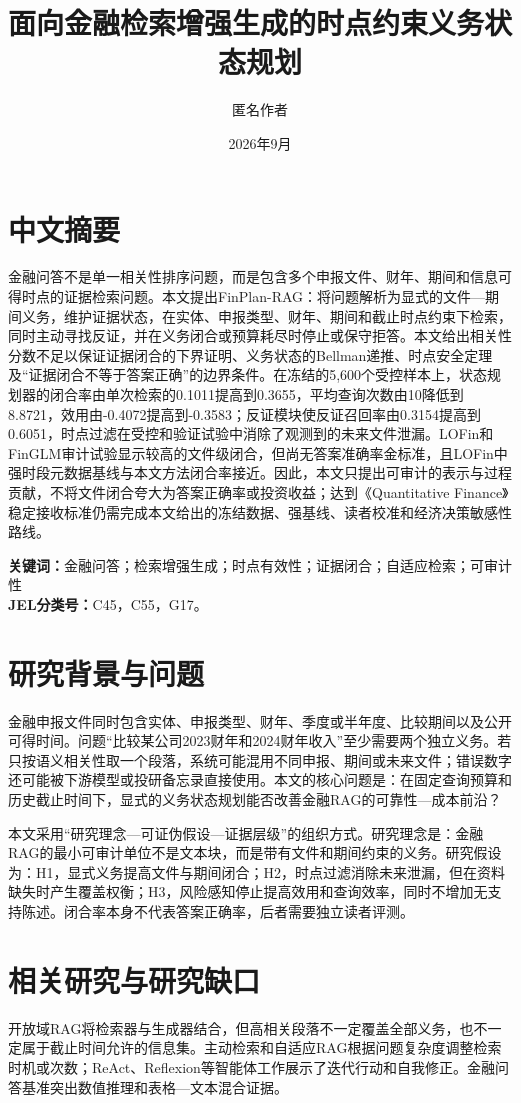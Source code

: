 \documentclass[12pt,openright]{ctexbook}
\title{面向金融检索增强生成的\mbox{时点约束义务状态规划}}
\author{匿名作者}
\date{2026年9月}
\newcommand{\finplan}{FinPlan\mbox{-}RAG}
\begin{document}
\frontmatter
\maketitle
\chapter*{中文摘要}
金融问答不是单一相关性排序问题，而是包含多个申报文件、财年、期间和信息可得时点的证据检索问题。本文提出\finplan：将问题解析为显式的文件—期间义务，维护证据状态，在实体、申报类型、财年、期间和截止时点约束下检索，同时主动寻找反证，并在义务闭合或预算耗尽时停止或保守拒答。本文给出相关性分数不足以保证证据闭合的下界证明、义务状态的Bellman递推、时点安全定理及“证据闭合不等于答案正确”的边界条件。在冻结的5,600个受控样本上，状态规划器的闭合率由单次检索的0.1011提高到0.3655，平均查询次数由10降低到8.8721，效用由-0.4072提高到-0.3583；反证模块使反证召回率由0.3154提高到0.6051，时点过滤在受控和验证试验中消除了观测到的未来文件泄漏。LOFin和FinGLM审计试验显示较高的文件级闭合，但尚无答案准确率金标准，且LOFin中强时段元数据基线与本文方法闭合率接近。因此，本文只提出可审计的表示与过程贡献，不将文件闭合夸大为答案正确率或投资收益；达到《Quantitative Finance》稳定接收标准仍需完成本文给出的冻结数据、强基线、读者校准和经济决策敏感性路线。

\noindent\textbf{关键词：}金融问答；检索增强生成；时点有效性；证据闭合；自适应检索；可审计性\\
\noindent\textbf{JEL分类号：}C45，C55，G17。

\tableofcontents
\mainmatter

\chapter{研究背景与问题}
金融申报文件同时包含实体、申报类型、财年、季度或半年度、比较期间以及公开可得时间。问题“比较某公司2023财年和2024财年收入”至少需要两个独立义务。若只按语义相关性取一个段落，系统可能混用不同申报、期间或未来文件；错误数字还可能被下游模型或投研备忘录直接使用。本文的核心问题是：在固定查询预算和历史截止时间下，显式的义务状态规划能否改善金融RAG的可靠性—成本前沿？

本文采用“研究理念—可证伪假设—证据层级”的组织方式。研究理念是：金融RAG的最小可审计单位不是文本块，而是带有文件和期间约束的义务。研究假设为：H1，显式义务提高文件与期间闭合；H2，时点过滤消除未来泄漏，但在资料缺失时产生覆盖权衡；H3，风险感知停止提高效用和查询效率，同时不增加无支持陈述。闭合率本身不代表答案正确率，后者需要独立读者评测。

\chapter{相关研究与研究缺口}
开放域RAG将检索器与生成器结合，但高相关段落不一定覆盖全部义务，也不一定属于截止时间允许的信息集\citep{lewis2020rag,mallen2023parametric}。主动检索和自适应RAG根据问题复杂度调整检索时机或次数\citep{jiang2023flare,jeong2024adaptiverag}；ReAct、Reflexion等智能体工作展示了迭代行动和自我修正\citep{yao2023react,shinn2023reflexion}。金融问答基准突出数值推理和表格—文本混合证据\citep{chen2021finqa,zhu2021tatqa,islam2023financebench}。
\end{document}
